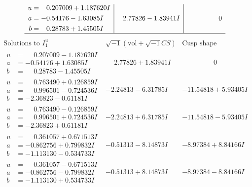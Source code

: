 \documentclass[1p]{elsarticle_modified}
\theoremstyle{definition}
\newcommand{\I}{\sqrt{-1}}
\begin{document}
$$\begin{array}{c|c|c}
\begin{aligned}
u &= \phantom{-}0.207009 + 1.187620 I \\
a &= -0.54176 - 1.63085 I \\
b &= \phantom{-}0.28783 + 1.45505 I\end{aligned}
 & \phantom{-}2.77826 - 1.83941 I & \phantom{-0.000000 } 0\\
 \hline 
 \end{array}$$\newpage$$\begin{array}{c|c|c}  
\text{Solutions to }I^u_{1}& \I (\text{vol} + \sqrt{-1}CS) & \text{Cusp shape}\\
 \hline 
\begin{aligned}
u &= \phantom{-}0.207009 - 1.187620 I \\
a &= -0.54176 + 1.63085 I \\
b &= \phantom{-}0.28783 - 1.45505 I\end{aligned}
 & \phantom{-}2.77826 + 1.83941 I & \phantom{-0.000000 } 0 \\ \hline\begin{aligned}
u &= \phantom{-}0.763490 + 0.126859 I \\
a &= \phantom{-}0.996501 - 0.724536 I \\
b &= -2.36823 - 0.61181 I\end{aligned}
 & -2.24813 - 6.31785 I & -11.54818 + 5.93405 I \\ \hline\begin{aligned}
u &= \phantom{-}0.763490 - 0.126859 I \\
a &= \phantom{-}0.996501 + 0.724536 I \\
b &= -2.36823 + 0.61181 I\end{aligned}
 & -2.24813 + 6.31785 I & -11.54818 - 5.93405 I \\ \hline\begin{aligned}
u &= \phantom{-}0.361057 + 0.671513 I \\
a &= -0.862756 + 0.799832 I \\
b &= -1.113130 - 0.534733 I\end{aligned}
 & -0.51313 - 8.14873 I & -8.97384 + 8.84166 I \\ \hline\begin{aligned}
u &= \phantom{-}0.361057 - 0.671513 I \\
a &= -0.862756 - 0.799832 I \\
b &= -1.113130 + 0.534733 I\end{aligned}
 & -0.51313 + 8.14873 I & -8.97384 - 8.84166 I \\ \hline\begin{aligned}

\end{aligned}
\end{array}$$
\end{document}
